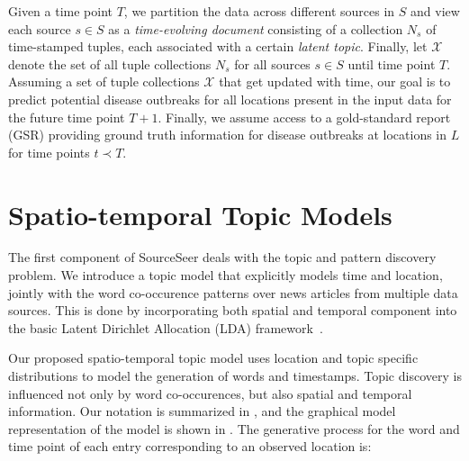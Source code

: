 \documentclass[twoside,leqno,twocolumn]{article}
\newcommand{\fullmodel}{{{\sf SourceSeer}}\xspace}
\begin{document}
Given a time point $T$, we partition the data across different sources in $S$ and view each source $s \in S$ as a {\em time-evolving document} consisting of a collection $N_s$ of time-stamped tuples, each associated with a certain {\em latent topic}. Finally, let $\mathcal{X}$ denote the set of all tuple collections $N_s$ for all sources $s \in S$ until time point $T$. Assuming a set of tuple collections $\mathcal{X}$ that get updated with time, our goal is to predict potential disease outbreaks for all locations present in the input data for the future time point $T+1$. Finally, we assume access to a gold-standard report (GSR) providing ground truth information for disease outbreaks at locations in $L$ for time points $t \prec T$. 

\section{Spatio-temporal Topic Models}
\label{sec:model}
The first component of \fullmodel deals with the topic and pattern discovery problem.  We introduce a topic model that explicitly models time and location, jointly with the word co-occurence patterns over news articles from multiple data sources. This is done by incorporating both spatial and temporal component into the basic Latent Dirichlet Allocation (LDA) framework~\cite{blei:2003}.

Our proposed spatio-temporal topic model uses location and topic specific distributions to model the generation of words and timestamps. Topic discovery is influenced not only by word co-occurences, but also spatial and temporal information. Our notation is summarized in , and the graphical model representation of the model is shown in .  The generative process for the word and time point of each entry corresponding to an observed location is:
\end{document}
